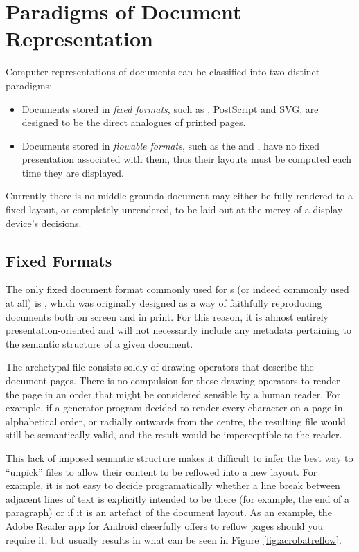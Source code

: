 \section{Paradigms of Document Representation}
Computer representations of documents can be classified into two distinct paradigms:
\begin{itemize}
 \item Documents stored in \emph{fixed formats}, such as \pdf{}, PostScript and \textsc{SVG}, are designed to be the direct analogues of printed pages.
 \item Documents stored in \emph{flowable formats}, such as the \html{} and \epub{}, have no fixed presentation associated with them, thus their layouts must be computed each time they are displayed.
\end{itemize}
Currently there is no middle ground\ed a document may either be fully rendered to a fixed layout, or completely unrendered, to be laid out at the mercy of a display device's decisions.

\subsection{Fixed Formats}
\label{sec:fixedformats}
The only fixed document format commonly used for \ebook{}s (or indeed commonly used at all) is \pdf{}, which was originally designed as a way of faithfully reproducing documents both on screen and in print.\cite{Warnock1991} For this reason, it is almost entirely pre\-s\-en\-ta\-tion-oriented and will not necessarily include any metadata pertaining to the semantic structure of a given document.

The archetypal \pdf{} file consists solely of drawing operators that describe the document pages. There is no compulsion for these drawing operators to render the page in an order that might be considered sensible by a human reader. For example, if a \pdf{} generator program decided to render every character on a page in alphabetical order, or radially outwards from the centre, the resulting file would still be semantically valid, and the result would be imperceptible to the reader.

This lack of imposed semantic structure makes it difficult to infer the best way to ``unpick'' \pdf{} files to allow their content to be reflowed into a new layout.\cite{Lovegrove1995, Bagley2005} For example, it is not easy to decide programatically whether a line break between adjacent lines of text is explicitly intended to be there (for example, the end of a paragraph) or if it is an artefact of the document layout. As an example, the Adobe Reader app for Android cheerfully offers to reflow \pdf{} pages should you require it, but usually results in what can be seen in Figure~\ref{fig:acrobatreflow}.

